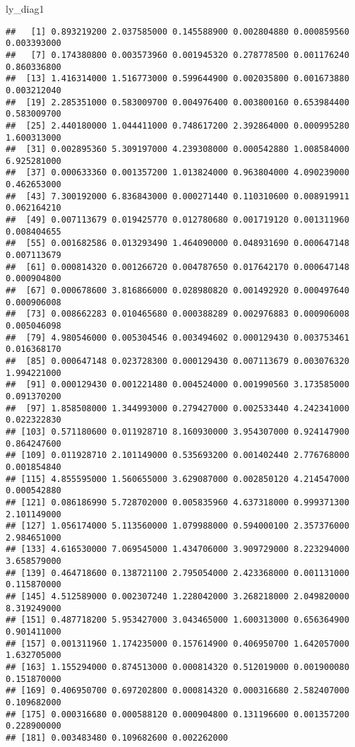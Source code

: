 \documentclass[
]{article}
\newenvironment{Shaded}{\begin{snugshade}}{\end{snugshade}}
\newcommand{\NormalTok}[1]{#1}
\begin{document}
\begin{Shaded}
\begin{Highlighting}[]
\NormalTok{ly\_diag1}
\end{Highlighting}
\end{Shaded}

\begin{verbatim}
##   [1] 0.893219200 2.037585000 0.145588900 0.002804880 0.000859560 0.003393000
##   [7] 0.174380800 0.003573960 0.001945320 0.278778500 0.001176240 0.860336800
##  [13] 1.416314000 1.516773000 0.599644900 0.002035800 0.001673880 0.003212040
##  [19] 2.285351000 0.583009700 0.004976400 0.003800160 0.653984400 0.583009700
##  [25] 2.440180000 1.044411000 0.748617200 2.392864000 0.000995280 1.600313000
##  [31] 0.002895360 5.309197000 4.239308000 0.000542880 1.008584000 6.925281000
##  [37] 0.000633360 0.001357200 1.013824000 0.963804000 4.090239000 0.462653000
##  [43] 7.300192000 6.836843000 0.000271440 0.110310600 0.008919911 0.062164210
##  [49] 0.007113679 0.019425770 0.012780680 0.001719120 0.001311960 0.008404655
##  [55] 0.001682586 0.013293490 1.464090000 0.048931690 0.000647148 0.007113679
##  [61] 0.000814320 0.001266720 0.004787650 0.017642170 0.000647148 0.000904800
##  [67] 0.000678600 3.816866000 0.028980820 0.001492920 0.000497640 0.000906008
##  [73] 0.008662283 0.010465680 0.000388289 0.002976883 0.000906008 0.005046098
##  [79] 4.980546000 0.005304546 0.003494602 0.000129430 0.003753461 0.016368170
##  [85] 0.000647148 0.023728300 0.000129430 0.007113679 0.003076320 1.994221000
##  [91] 0.000129430 0.001221480 0.004524000 0.001990560 3.173585000 0.091370200
##  [97] 1.858508000 1.344993000 0.279427000 0.002533440 4.242341000 0.022322830
## [103] 0.571180600 0.011928710 8.160930000 3.954307000 0.924147900 0.864247600
## [109] 0.011928710 2.101149000 0.535693200 0.001402440 2.776768000 0.001854840
## [115] 4.855595000 1.560655000 3.629087000 0.002850120 4.214547000 0.000542880
## [121] 0.086186990 5.728702000 0.005835960 4.637318000 0.999371300 2.101149000
## [127] 1.056174000 5.113560000 1.079988000 0.594000100 2.357376000 2.984651000
## [133] 4.616530000 7.069545000 1.434706000 3.909729000 8.223294000 3.658579000
## [139] 0.464718600 0.138721100 2.795054000 2.423368000 0.001131000 0.115870000
## [145] 4.512589000 0.002307240 1.228042000 3.268218000 2.049820000 8.319249000
## [151] 0.487718200 5.953427000 3.043465000 1.600313000 0.656364900 0.901411000
## [157] 0.001311960 1.174235000 0.157614900 0.406950700 1.642057000 1.632705000
## [163] 1.155294000 0.874513000 0.000814320 0.512019000 0.001900080 0.151870000
## [169] 0.406950700 0.697202800 0.000814320 0.000316680 2.582407000 0.109682000
## [175] 0.000316680 0.000588120 0.000904800 0.131196600 0.001357200 0.228900000
## [181] 0.003483480 0.109682600 0.002262000
\end{verbatim}
\end{document}
